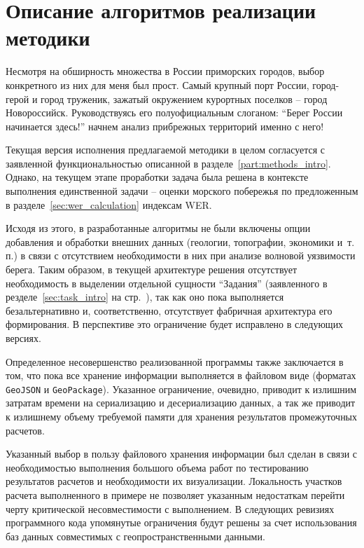 \newpage
\section{Описание алгоритмов реализации методики}
\label{part:alghoritm_intro}


Несмотря на обширность множества в России приморских городов, выбор конкретного из них для меня был прост.
Самый крупный порт России, город-герой и город труженик, зажатый окружением курортных поселков -- город Новороссийск.
Руководствуясь его полуофициальным слоганом: \enquote{Берег России начинается здесь!} начнем анализ прибрежных территорий именно с него!

Текущая версия исполнения предлагаемой методики в целом согласуется с заявленной функциональностью описанной в разделе~\ref{part:methods_intro}.
Однако, на текущем этапе проработки задача была решена в контексте выполнения единственной задачи -- оценки морского побережья по предложенным в разделе~\ref{sec:wer_calculation} индексам WER.

Исходя из этого, в разработанные алгоритмы не были включены опции добавления и обработки внешних данных (геологии, топографии, экономики и~т.\,п.) в связи с отсутствием необходимости в них при анализе волновой уязвимости берега.
Таким образом, в текущей архитектуре решения отсутствует необходимость в выделении отдельной сущности \enquote{Задания} (заявленного в резделе~\ref{sec:task_intro} на стр.~\pageref{sec:task_end}), так как оно пока выполняется безальтернативно и, соответственно, отсутствует фабричная архитектура его формирования.
В перспективе это ограничение будет исправлено в следующих версиях.

Определенное несовершенство реализованной программы также заключается в том, что пока все хранение информации выполняется в файловом виде (форматах \texttt{GeoJSON} и \texttt{GeoPackage}).
Указанное ограничение, очевидно, приводит к излишним затратам времени на сериализацию и десериализацию данных, а так же приводит к излишнему объему требуемой памяти для хранения результатов промежуточных расчетов.

Указанный выбор в пользу файлового хранения информации был сделан в связи с необходимостью выполнения большого объема работ по тестированию результатов расчетов и необходимости их визуализации.
Локальность участков расчета выполненного в примере не позволяет указанным недостаткам перейти черту критической несовместимости с выполнением.
В следующих ревизиях программного кода упомянутые ограничения будут решены за счет использования баз данных совместимых с геопространственными данными.
